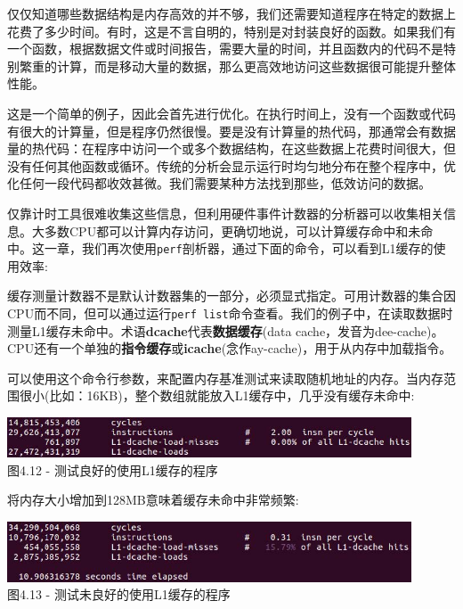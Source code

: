仅仅知道哪些数据结构是内存高效的并不够，我们还需要知道程序在特定的数据上花费了多少时间。有时，这是不言自明的，特别是对封装良好的函数。如果我们有一个函数，根据数据文件或时间报告，需要大量的时间，并且函数内的代码不是特别繁重的计算，而是移动大量的数据，那么更高效地访问这些数据很可能提升整体性能。

这是一个简单的例子，因此会首先进行优化。在执行时间上，没有一个函数或代码有很大的计算量，但是程序仍然很慢。要是没有计算量的热代码，那通常会有数据量的热代码：在程序中访问一个或多个数据结构，在这些数据上花费时间很大，但没有任何其他函数或循环。传统的分析会显示运行时均匀地分布在整个程序中，优化任何一段代码都收效甚微。我们需要某种方法找到那些，低效访问的数据。

仅靠计时工具很难收集这些信息，但利用硬件事件计数器的分析器可以收集相关信息。大多数CPU都可以计算内存访问，更确切地说，可以计算缓存命中和未命中。这一章，我们再次使用\texttt{perf}剖析器，通过下面的命令，可以看到L1缓存的使用效率:


缓存测量计数器不是默认计数器集的一部分，必须显式指定。可用计数器的集合因CPU而不同，但可以通过运行\texttt{perf list}命令查看。我们的例子中，在读取数据时测量L1缓存未命中。术语\textbf{dcache}代表\textbf{数据缓存}(data cache，发音为dee-cache)。CPU还有一个单独的\textbf{指令缓存}或\textbf{icache}(念作ay-cache)，用于从内存中加载指令。

可以使用这个命令行参数，来配置内存基准测试来读取随机地址的内存。当内存范围很小(比如：16KB)，整个数组就能放入L1缓存中，几乎没有缓存未命中:

\begin{center}
\includegraphics[width=0.9\textwidth]{content/1/chapter4/images/12.jpg}\\
图4.12 - 测试良好的使用L1缓存的程序
\end{center}

将内存大小增加到128MB意味着缓存未命中非常频繁:

\begin{center}
\includegraphics[width=0.9\textwidth]{content/1/chapter4/images/13.jpg}\\
图4.13 - 测试未良好的使用L1缓存的程序
\end{center}

